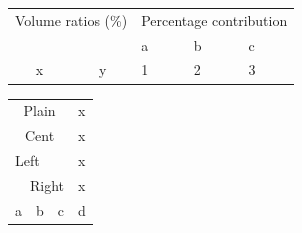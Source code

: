\documentclass{article}
\begin{document}
\begin{tabular}{cclll}
\toprule
\multicolumn{2}{p{4cm}}{\centering Volume ratios (\%)} &
 \multicolumn{3}{c}{\centering Percentage contribution} \\[-22pt]
 & & a & b & c \\
\midrule
x & y & 1 & 2 & 3 \\
\bottomrule
\end{tabular}

\begin{tabular}{clll}
\multicolumn{3}{c}{Plain} & x \\
\multicolumn{3}{c}{\centering Cent} & x \\
\multicolumn{3}{l}{Left} & x \\
\multicolumn{3}{r}{Right} & x \\
a & b & c & d \\
\end{tabular}
\end{document}

